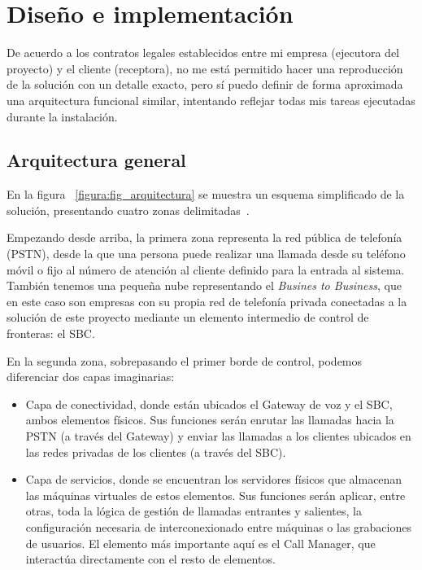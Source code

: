 \documentclass[a4paper, 12pt]{book}
\begin{document}

\cleardoublepage
\chapter{Diseño e implementación}

De acuerdo a los contratos legales establecidos entre mi empresa (ejecutora del proyecto) y el cliente (receptora), no me está permitido hacer una reproducción de la solución con un detalle exacto, pero sí puedo definir de forma aproximada una arquitectura funcional similar, intentando reflejar todas mis tareas ejecutadas durante la instalación.

\section{Arquitectura general}
\label{sec:arquitectura}

En la figura ~\ref{figura:fig_arquitectura} se muestra un esquema simplificado de la solución, presentando cuatro zonas delimitadas~\cite{cisco:_ccna}.

Empezando desde arriba, la primera zona representa la red pública de telefonía (PSTN), desde la que una persona puede realizar una llamada desde su teléfono móvil o fijo al número de atención al cliente definido para la entrada al sistema. También tenemos una pequeña nube representando el \emph{Busines to Business}, que en este caso son empresas con su propia red de telefonía privada conectadas a la solución de este proyecto mediante un elemento intermedio de control de fronteras: el SBC.

En la segunda zona, sobrepasando el primer borde de control, podemos diferenciar dos capas imaginarias:
\begin{itemize}
  \item Capa de conectividad, donde están ubicados el Gateway de voz y el SBC, ambos elementos físicos. Sus funciones serán enrutar las llamadas hacia la PSTN (a través del Gateway) y enviar las llamadas a los clientes ubicados en las redes privadas de los clientes (a través del SBC).
  \item Capa de servicios, donde se encuentran los servidores físicos que almacenan las máquinas virtuales de estos elementos. Sus funciones serán aplicar, entre otras, toda la lógica de gestión de llamadas entrantes y salientes, la configuración necesaria de interconexionado entre máquinas o las grabaciones de usuarios. El elemento más importante aquí es el Call Manager, que interactúa directamente con el resto de elementos.
\end{itemize}
\end{document}

